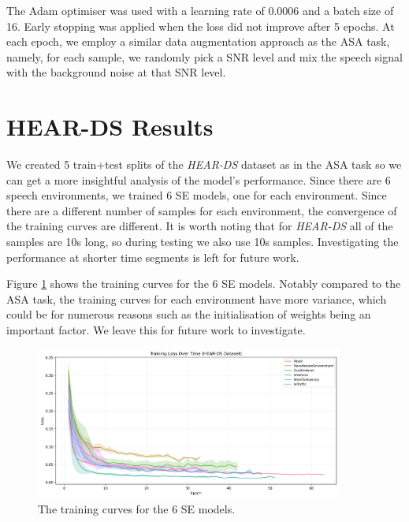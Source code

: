 \documentclass[logo,bsc,singlespacing,parskip,online]{infthesis}
\newcommand{\heards}{\textit{HEAR-DS}\xspace}
\begin{document}
The Adam optimiser was used with a learning rate of 0.0006 and a batch size of 16.
Early stopping was applied when the loss did not improve after 5 epochs.
At each epoch, we employ a similar data augmentation approach as the ASA task, 
namely, for each sample, we randomly pick a SNR level and mix the speech signal with the background noise 
at that SNR level. 


% 

\section{HEAR-DS Results}
We created 5 train+test splits of the \heards dataset as in the ASA task so we can 
get a more insightful analysis of the model's performance. Since there 
are 6 speech environments, we trained 6 SE models, one for each environment. 
Since there are a different number of samples for each environment, 
the convergence of the training curves are different. 
It is worth noting that for \heards all of the samples are 10s long,
so during testing we also use 10s samples. Investigating 
the performance at shorter time segments is left for future work.

Figure \ref{fig:hear-ds-training-curves} shows the training curves for the 
6 SE models. Notably compared to the ASA task, the training curves for each 
environment have more variance, which could be for numerous reasons such 
as the initialisation of weights being an important factor. We leave this 
for future work to investigate.

\begin{figure}[h]
   \centering
   \includegraphics[width=0.9\textwidth]{se-hear-ds_training_losses.png}
   \caption{The training curves for the 6 SE models.}
   \label{fig:hear-ds-training-curves}
\end{figure}
\end{document}
